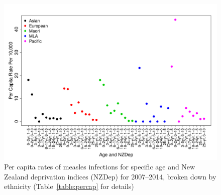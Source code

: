 \documentclass{article}
\begin{document}
\begin{figure}
\begin{center}
\includegraphics{draftfinalreport-010}
\end{center}
\caption{Per capita rates of measles infections for specific age and New Zealand deprivation indices (NZDep) for 2007--2014, broken down by ethnicity (Table~\ref{table:percap} for details)}
\label{fig:percap}
\end{figure}
\end{document}
